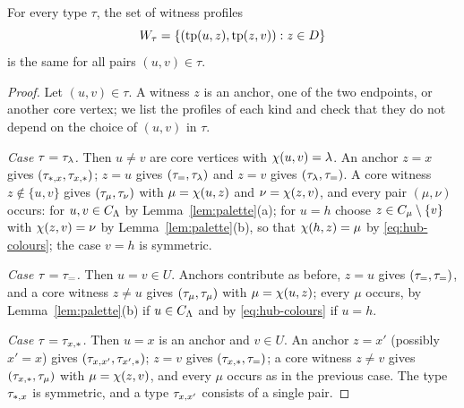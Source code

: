 \begin{lemma}[Homogeneity]\label{lem:profile}
For every type $\tau$, the set of witness profiles
\[
 W_\tau=\{(\operatorname{tp}(u,z),\operatorname{tp}(z,v)):z\in D\}
\]
is the same for all pairs $(u,v)\in\tau$.
\end{lemma}
\begin{proof}
Let $(u,v)\in\tau$. A witness $z$ is an anchor, one of the two endpoints, or
another core vertex; we list the profiles of each kind and check that they
do not depend on the choice of $(u,v)$ in $\tau$.

\emph{Case $\tau=\tau_{\lambda}$.} Then $u\ne v$ are core vertices with
$\chi(u,v)=\lambda$. An anchor $z=x$ gives $(\tau_{\ast,x},\tau_{x,\ast})$; $z=u$ gives
$(\tau_{=},\tau_{\lambda})$ and $z=v$ gives $(\tau_{\lambda},\tau_{=})$. A core
witness $z\notin\{u,v\}$ gives $(\tau_{\mu},\tau_{\nu})$ with
$\mu=\chi(u,z)$ and $\nu=\chi(z,v)$, and every pair $(\mu,\nu)$ occurs:
for $u,v\in C_{\Lambda}$ by Lemma~\ref{lem:palette}(a); for $u=h$ choose
$z\in C_{\mu}\setminus\{v\}$ with $\chi(z,v)=\nu$ by
Lemma~\ref{lem:palette}(b), so that $\chi(h,z)=\mu$ by
\eqref{eq:hub-colours}; the case $v=h$ is symmetric.

\emph{Case $\tau=\tau_{=}$.} Then $u=v\in U$. Anchors contribute as before, $z=u$
gives $(\tau_{=},\tau_{=})$, and a core witness $z\ne u$ gives
$(\tau_{\mu},\tau_{\mu})$ with $\mu=\chi(u,z)$; every $\mu$ occurs, by
Lemma~\ref{lem:palette}(b) if $u\in C_{\Lambda}$ and by
\eqref{eq:hub-colours} if $u=h$.

\emph{Case $\tau=\tau_{x,\ast}$.} Then $u=x$ is an anchor and $v\in U$. An anchor $z=x'$
(possibly $x'=x$) gives $(\tau_{x,x'},\tau_{x',\ast})$; $z=v$ gives
$(\tau_{x,\ast},\tau_{=})$; a core witness $z\ne v$ gives $(\tau_{x,\ast},\tau_{\mu})$ with
$\mu=\chi(z,v)$, and every $\mu$ occurs as in the previous case. The type
$\tau_{\ast,x}$ is symmetric, and a type $\tau_{x,x'}$ consists of a single pair.
\end{proof}


